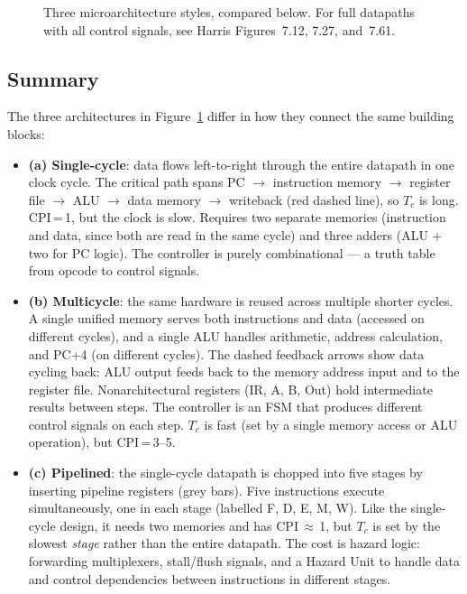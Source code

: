 \documentclass[9pt, a4paper]{extarticle}
\begin{document}
\begin{figure}[htbp]
    \caption{Three microarchitecture styles, compared below. For full datapaths with all control signals, see Harris Figures~7.12, 7.27, and~7.61.}
    \label{fig:microarch-compare}
\end{figure}

\subsection{Summary}

The three architectures in Figure~\ref{fig:microarch-compare} differ in how they connect the same building blocks:

\begin{itemize}
    \item \textbf{(a) Single-cycle}: data flows left-to-right through the entire datapath in one clock cycle. The critical path spans PC $\to$ instruction memory $\to$ register file $\to$ ALU $\to$ data memory $\to$ writeback (red dashed line), so $T_c$ is long. CPI\,=\,1, but the clock is slow. Requires two separate memories (instruction and data, since both are read in the same cycle) and three adders (ALU + two for PC logic). The controller is purely combinational --- a truth table from opcode to control signals.

    \item \textbf{(b) Multicycle}: the same hardware is reused across multiple shorter cycles. A single unified memory serves both instructions and data (accessed on different cycles), and a single ALU handles arithmetic, address calculation, and PC+4 (on different cycles). The dashed feedback arrows show data cycling back: ALU output feeds back to the memory address input and to the register file. Nonarchitectural registers (IR, A, B, Out) hold intermediate results between steps. The controller is an FSM that produces different control signals on each step. $T_c$ is fast (set by a single memory access or ALU operation), but CPI\,=\,3--5.

    \item \textbf{(c) Pipelined}: the single-cycle datapath is chopped into five stages by inserting pipeline registers (grey bars). Five instructions execute simultaneously, one in each stage (labelled F, D, E, M, W). Like the single-cycle design, it needs two memories and has CPI\,$\approx$\,1, but $T_c$ is set by the slowest \emph{stage} rather than the entire datapath. The cost is hazard logic: forwarding multiplexers, stall/flush signals, and a Hazard Unit to handle data and control dependencies between instructions in different stages.
\end{itemize}
\end{document}
